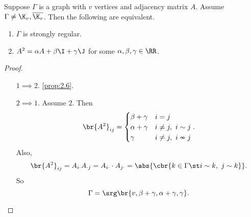 \begin{proposition}
\label{prop:3.19}
Suppose $ \Gamma $ is a graph with $ v $ vertices and adjacency matrix $ A $. Assume $ \Gamma \ne \K_v, \overline{\K_v} $. Then the following are equivalent.
\begin{enumerate}
\item $ \Gamma $ is strongly regular.
\item $ A^2 = \alpha A + \beta\I + \gamma\J $ for some $ \alpha, \beta, \gamma \in \RR $.
\end{enumerate}
\end{proposition}

\begin{proof}
\hfill
\begin{itemize}[leftmargin=0.5in]
\item[$ 1 \implies 2 $.] \ref{prop:2.6}.
\item[$ 2 \implies 1 $.] Assume $ 2 $. Then
$$ \br{A^2}_{ij} =
\begin{cases}
\beta + \gamma & i = j \\
\alpha + \gamma & i \ne j, \ i \sim j \\
\gamma & i \ne j, \ i \nsim j
\end{cases}.
$$
Also,
$$ \br{A^2}_{ij} = A_{i\cdot}A_{\cdot j} = A_{i \cdot} \cdot A_{j\cdot} = \abs{\cbr{k \in \Gamma \st i \sim k, \ j \sim k}}. $$
So
$$ \Gamma = \srg\br{v, \beta + \gamma, \alpha + \gamma, \gamma}. $$
\end{itemize}
\end{proof}

\pagebreak

